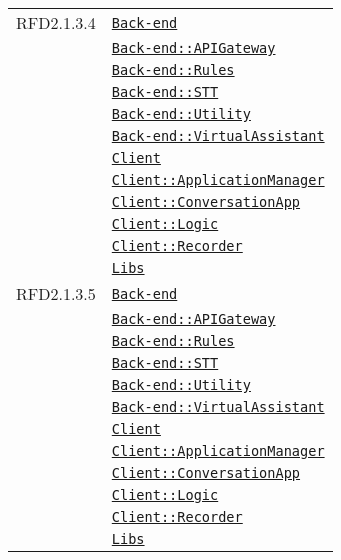 \begin{longtable}{|>{\centering}m{3cm}|m{10cm}<{\centering}|}
RFD2.1.3.4 & \hyperref[Back-end]{\texttt{Back-end}}\\
& \hyperref[Back-end::APIGateway]{\texttt{Back-end::APIGateway}}\\
& \hyperref[Back-end::Rules]{\texttt{Back-end::Rules}}\\
& \hyperref[Back-end::STT]{\texttt{Back-end::STT}}\\
& \hyperref[Back-end::Utility]{\texttt{Back-end::Utility}}\\
& \hyperref[Back-end::VirtualAssistant]{\texttt{Back-end::VirtualAssistant}}\\
& \hyperref[Client]{\texttt{Client}}\\
& \hyperref[Client::ApplicationManager]{\texttt{Client::ApplicationManager}}\\
& \hyperref[Client::ConversationApp]{\texttt{Client::ConversationApp}}\\
& \hyperref[Client::Logic]{\texttt{Client::Logic}}\\
& \hyperref[Client::Recorder]{\texttt{Client::Recorder}}\\
& \hyperref[Libs]{\texttt{Libs}}\\ \hline

RFD2.1.3.5 & \hyperref[Back-end]{\texttt{Back-end}}\\
& \hyperref[Back-end::APIGateway]{\texttt{Back-end::APIGateway}}\\
& \hyperref[Back-end::Rules]{\texttt{Back-end::Rules}}\\
& \hyperref[Back-end::STT]{\texttt{Back-end::STT}}\\
& \hyperref[Back-end::Utility]{\texttt{Back-end::Utility}}\\
& \hyperref[Back-end::VirtualAssistant]{\texttt{Back-end::VirtualAssistant}}\\
& \hyperref[Client]{\texttt{Client}}\\
& \hyperref[Client::ApplicationManager]{\texttt{Client::ApplicationManager}}\\
& \hyperref[Client::ConversationApp]{\texttt{Client::ConversationApp}}\\
& \hyperref[Client::Logic]{\texttt{Client::Logic}}\\
& \hyperref[Client::Recorder]{\texttt{Client::Recorder}}\\
& \hyperref[Libs]{\texttt{Libs}}\\ \hline


\end{longtable}

